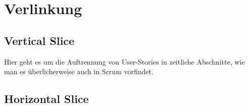 \chapter{Verlinkung}
\section{Vertical Slice}
Hier geht es um die Auftrennung von User-Stories in zeitliche Abschnitte, wie man es überlicherweise auch in Scrum vorfindet.

\section{Horizontal Slice}


